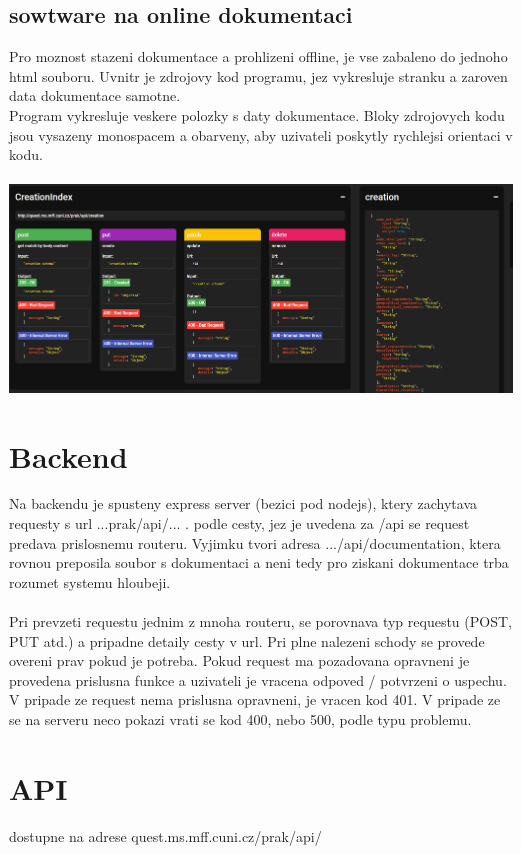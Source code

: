 \subsection{sowtware na online dokumentaci}
Pro moznost stazeni dokumentace a prohlizeni offline, je vse zabaleno do jednoho html souboru.
Uvnitr je zdrojovy kod programu, jez vykresluje stranku a zaroven data dokumentace samotne.
\\
Program vykresluje veskere polozky s daty dokumentace.
Bloky zdrojovych kodu jsou vysazeny monospacem a obarveny, aby uzivateli
poskytly rychlejsi orientaci v kodu.
\\\\
\includegraphics[width=\textwidth]{img/documentationPreview.PNG}


\section{Backend}
Na backendu je spusteny express server (bezici pod nodejs), ktery
zachytava requesty s url ...prak/api/... .
podle cesty, jez je uvedena za /api se request predava
prislosnemu routeru. Vyjimku tvori adresa .../api/documentation, ktera
rovnou preposila soubor s dokumentaci a neni tedy pro ziskani dokumentace
trba rozumet systemu hloubeji.
\\
\\
Pri prevzeti requestu jednim z mnoha routeru, se porovnava
typ requestu (POST, PUT atd.) a pripadne detaily cesty v url.
Pri plne nalezeni schody se provede overeni prav pokud je potreba.
Pokud request ma pozadovana opravneni je provedena prislusna funkce
a uzivateli je vracena odpoved / potvrzeni o uspechu.
V pripade ze request nema prislusna opravneni, je vracen kod 401.
V pripade ze se na serveru neco pokazi vrati se kod 400, nebo 500, podle typu problemu.

\section{API}
dostupne na adrese quest.ms.mff.cuni.cz/prak/api/

